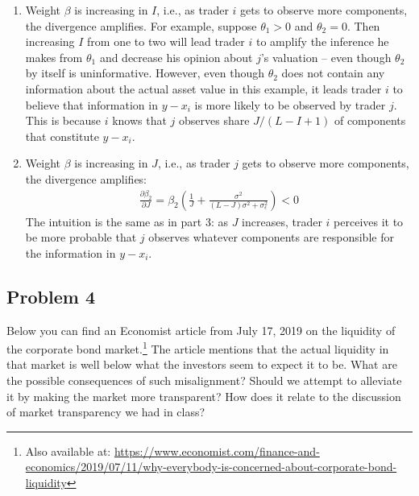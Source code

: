 \begin{solution}
\begin{enumerate}
		\item Weight $\beta$ is increasing in $I$, i.e., as trader $i$ gets to observe more components, the divergence amplifies. For example, suppose $\theta_1 > 0$ and $\theta_2 = 0$. Then increasing $I$ from one to two will lead trader $i$ to amplify the inference he makes from $\theta_1$ and decrease his opinion about $j$'s valuation -- even though $\theta_2$ by itself is uninformative. However, even though $\theta_2$ does not contain any information about the actual asset value in this example, it leads trader $i$ to believe that information in $y-x_i$ is more likely to be observed by trader $j$. This is because $i$ knows that $j$ observes share $J/(L-I+1)$ of components that constitute $y-x_i$.
		
		\item Weight $\beta$ is increasing in $J$, i.e., as trader $j$ gets to observe more components, the divergence amplifies:
		\begin{align*}
			\frac{\partial \beta_2}{\partial J} = \beta_2 \left( \frac{1}{J} + \frac{\sigma^2}{(L-J)\sigma^2 + \sigma^2_\epsilon} \right) < 0
		\end{align*}
		The intuition is the same as in part 3: as $J$ increases, trader $i$ perceives it to be more probable that $j$ observes whatever components are responsible for the information in $y-x_i$.
	\end{enumerate}
\end{solution}




\quad
\subsection*{Problem 4}

Below you can find an Economist article from July 17, 2019 on the liquidity of the corporate bond market.\footnote{Also available at: \url{https://www.economist.com/finance-and-economics/2019/07/11/why-everybody-is-concerned-about-corporate-bond-liquidity}}
The article mentions that the actual liquidity in that market is well below what the investors seem to expect it to be. What are the possible consequences of such misalignment? Should we attempt to alleviate it by making the market more transparent? How does it relate to the discussion of market transparency we had in class?

